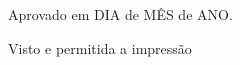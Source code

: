 \begin{folhadeaprovacao}
  \vspace{1cm}
  \vspace*{\fill}
    \begin{flushleft}
  	  Aprovado em DIA de MÊS de ANO. \\
    \end{flushleft}
  \vspace*{\fill}
    \vspace*{\fill}
    \begin{flushleft}
    	Visto e permitida a impressão\\
        \imprimirlocal
    \end{flushleft}
    
  
\end{folhadeaprovacao}


